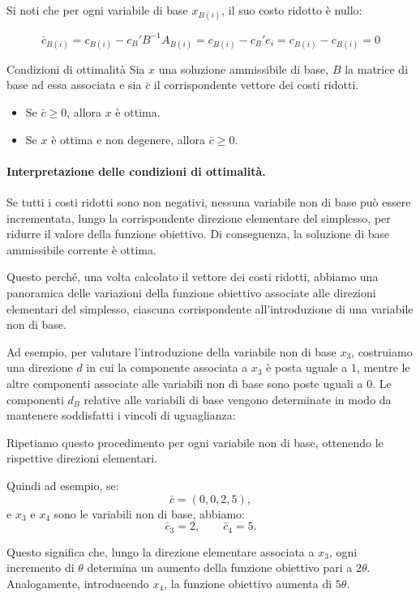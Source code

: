 Si noti che per ogni variabile di base $x_{B(i)}$, il suo costo ridotto è nullo:


$$\bar{c}_{B(i)} = c_{B(i)} - c_B' B^{-1} A_{B(i)} = c_{B(i)} - c_B' e_i = c_{B(i)} - c_{B(i)} = 0$$

\begin{theorem}{Condizioni di ottimalità}
Sia $x$ una soluzione ammissibile di base, $B$ la matrice di base ad essa associata e sia $\bar{c}$ il corrispondente vettore dei costi ridotti.
\begin{itemize}
    \item[(a)] Se $\bar{c} \ge 0$, allora $x$ è ottima.
    \item[(b)] Se $x$ è ottima e non degenere, allora $\bar{c} \ge 0$.
\end{itemize}
\end{theorem}

\paragraph{Interpretazione delle condizioni di ottimalità.}

Se tutti i costi ridotti sono non negativi, nessuna variabile non di base può essere incrementata, lungo la corrispondente direzione elementare del simplesso, per ridurre il valore della funzione obiettivo. Di conseguenza, la soluzione di base ammissibile corrente è ottima.

Questo perché, una volta calcolato il vettore dei costi ridotti, abbiamo una panoramica delle variazioni della funzione obiettivo associate alle direzioni elementari del simplesso, ciascuna corrispondente all'introduzione di una variabile non di base.

Ad esempio, per valutare l'introduzione della variabile non di base $x_3$, costruiamo una direzione $d$ in cui la componente associata a $x_3$ è posta uguale a $1$, mentre le altre componenti associate alle variabili non di base sono poste uguali a $0$. Le componenti $d_B$ relative alle variabili di base vengono determinate in modo da mantenere soddisfatti i vincoli di uguaglianza:

Ripetiamo questo procedimento per ogni variabile non di base, ottenendo le rispettive direzioni elementari.

Quindi ad esempio, se:
\[
\bar{c}=(0,0,2,5),
\]
e $x_3$ e $x_4$ sono le variabili non di base, abbiamo:
\[
\bar{c}_3=2, \qquad \bar{c}_4=5.
\]

Questo significa che, lungo la direzione elementare associata a $x_3$, ogni incremento di $\theta$ determina un aumento della funzione obiettivo pari a $2\theta$. Analogamente, introducendo $x_4$, la funzione obiettivo aumenta di $5\theta$.

